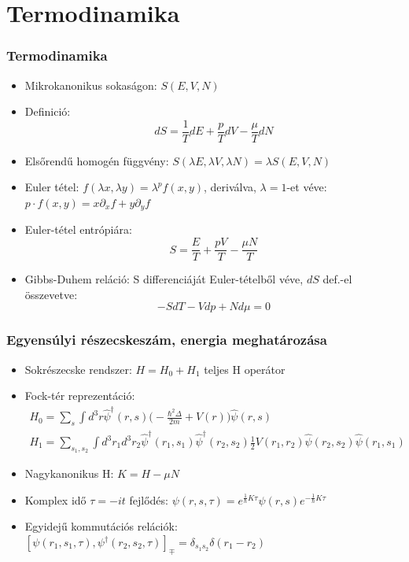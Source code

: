 \documentclass{beamer}
\begin{document}
\section{Termodinamika}
\begin{frame}
\frametitle{Termodinamika}
\begin{itemize}
  \setlength{\itemsep}{10pt}

	\item Mikrokanonikus sokaságon: $S(E, V, N)$
	\item Definició: 
		\begin{equation}
			dS = \frac{1}{T}dE +\frac{p}{T}dV-\frac{\mu}{T}dN
			\label{eq:t2}
\end{equation}
	\item Elsőrendű homogén függvény: $S(\lambda E, \lambda V, \lambda N) = \lambda S(E, V, N)$
	\item Euler tétel: $f(\lambda x, \lambda y) = \lambda^p f(x,y)$, deriválva, $\lambda=1$-et véve: $p\cdot f(x,y)=x\partial_x f + y\partial_y f$
	\item Euler-tétel entrópiára:
	\begin{equation}
	S = \frac{E}{T} + \frac{pV}{T}-\frac{\mu N}{T}
	\end{equation}
	
	\item Gibbs-Duhem reláció: S differenciáját Euler-tételből véve, $dS$ def.-el összevetve:
	\begin{equation}
	-SdT-Vdp+Nd\mu=0
	\end{equation}
  
\end{itemize}
\end{frame}


\begin{frame}
\frametitle{Egyensúlyi részecskeszám, energia meghatározása}
\begin{itemize}
  \setlength{\itemsep}{10pt}
	
	\item Sokrészecske rendszer: $H=H_0+H_1$ teljes H operátor
	\item Fock-tér reprezentáció:
	\begin{align*}
	H_0 = \sum_s \int d^3r \hat{\psi}^\dagger(r, s)\bigg(-\frac{\hbar^2\Delta}{2m} + V(r)\bigg)\hat{\psi}(r,s) \\
	H_1 = \sum_{s_1,s_2} \int d^3r_1d^3r_2 \hat{\psi}^\dagger(r_1, s_1)\hat{\psi}^\dagger(r_2, s_2)\frac{1}{2}V(r_1, r_2)\hat{\psi}(r_2,s_2)\hat{\psi}(r_1,s_1)
	\end{align*}
	\item Nagykanonikus H: $K=H-\mu N$
	\item Komplex idő $\tau = - it$ fejlődés: $\psi(r, s, \tau) = e^{\frac{1}{\hbar}K\tau}\psi(r,s)e^{-\frac{1}{\hbar}K\tau}$
  	\item Egyidejű kommutációs relációk: $[\psi(r_1, s_1, \tau), \psi^\dagger(r_2, s_2, \tau)]_{\mp}=\delta_{s_1s_2}\delta(r_1-r_2)$
\end{itemize}
\end{frame}
\end{document}
